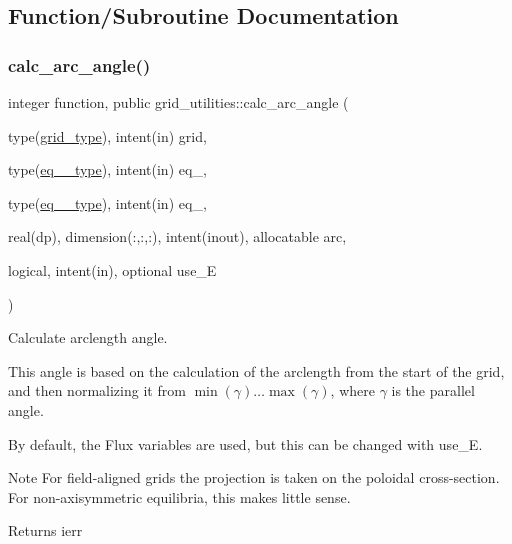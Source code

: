\subsection{Function/\+Subroutine Documentation}
\mbox{\label{namespacegrid__utilities_ac32a26bff5c635678f3f78ec9a540a65}} 
\subsubsection{\texorpdfstring{calc\+\_\+arc\+\_\+angle()}{calc\_arc\_angle()}}
{\footnotesize\ttfamily integer function, public grid\+\_\+utilities\+::calc\+\_\+arc\+\_\+angle (\begin{DoxyParamCaption}\item[{type(\hyperlink{structgrid__vars_1_1grid__type}{grid\+\_\+type}), intent(in)}]{grid,  }\item[{type(\hyperlink{structeq__vars_1_1eq__1__type}{eq\+\_\+1\+\_\+type}), intent(in)}]{eq\+\_,  }\item[{type(\hyperlink{structeq__vars_1_1eq__2__type}{eq\+\_\+2\+\_\+type}), intent(in)}]{eq\+\_,  }\item[{real(dp), dimension(\+:,\+:,\+:), intent(inout), allocatable}]{arc,  }\item[{logical, intent(in), optional}]{use\+\_\+E }\end{DoxyParamCaption})}



Calculate arclength angle. 

This angle is based on the calculation of the arclength from the start of the grid, and then normalizing it from $\min(\gamma)\ldots\max(\gamma)$, where $\gamma$ is the parallel angle.

By default, the Flux variables are used, but this can be changed with {\ttfamily use\+\_\+E}.

\begin{DoxyNote}{Note}
For field-\/aligned grids the projection is taken on the poloidal cross-\/section. For non-\/axisymmetric equilibria, this makes little sense.
\end{DoxyNote}
\begin{DoxyReturn}{Returns}
ierr
\end{DoxyReturn}

